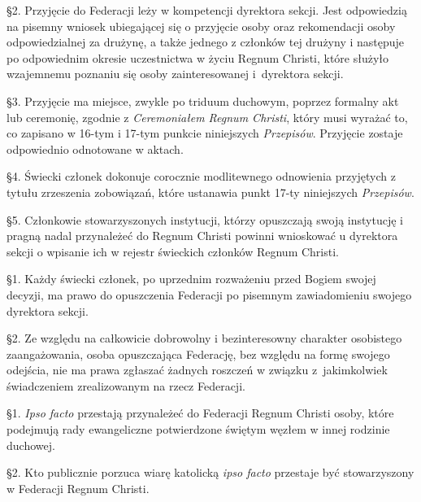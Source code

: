 \S{}2. Przyjęcie do Federacji leży w kompetencji dyrektora sekcji. Jest odpowiedzią na pisemny wniosek ubiegającej się o przyjęcie osoby oraz rekomendacji osoby odpowiedzialnej za drużynę, a także jednego z członków tej drużyny i następuje po odpowiednim okresie uczestnictwa w życiu Regnum Christi, które służyło wzajemnemu poznaniu się osoby zainteresowanej \mbox{i dyrektora} sekcji.

\S{}3. Przyjęcie ma miejsce, zwykle po triduum duchowym, poprzez formalny akt lub ceremonię, zgodnie z {\em Ceremoniałem Regnum Christi}, który musi wyrażać to, co zapisano w 16-tym i 17-tym punkcie niniejszych {\em Przepisów}. Przyjęcie zostaje odpowiednio odnotowane w aktach.

\S{}4. Świecki członek dokonuje corocznie modlitewnego odnowienia przyjętych z tytułu zrzeszenia zobowiązań, które ustanawia punkt 17-ty niniejszych {\em Przepisów}.

\S{}5. Członkowie stowarzyszonych instytucji, którzy opuszczają swoją instytucję i pragną nadal przynależeć do Regnum Christi powinni wnioskować u dyrektora sekcji o wpisanie ich w rejestr świeckich członków Regnum Christi.


 \S{}1. Każdy świecki członek, po uprzednim rozważeniu przed Bogiem swojej decyzji, ma prawo do opuszczenia Federacji po pisemnym zawiadomieniu swojego dyrektora sekcji.

\S{}2. Ze względu na całkowicie dobrowolny i bezinteresowny charakter osobistego zaangażowania, osoba opuszczająca Federację, bez względu na formę swojego odejścia, nie ma prawa zgłaszać żadnych roszczeń w związku \mbox{z jakimkolwiek} świadczeniem zrealizowanym na rzecz Federacji.


 \S{}1. {\em Ipso facto} przestają przynależeć do Federacji Regnum Christi osoby, które podejmują rady ewangeliczne potwierdzone świętym węzłem w innej rodzinie duchowej.

\S{}2. Kto publicznie porzuca wiarę katolicką {\em ipso facto} przestaje być stowarzyszony w Federacji Regnum Christi.


